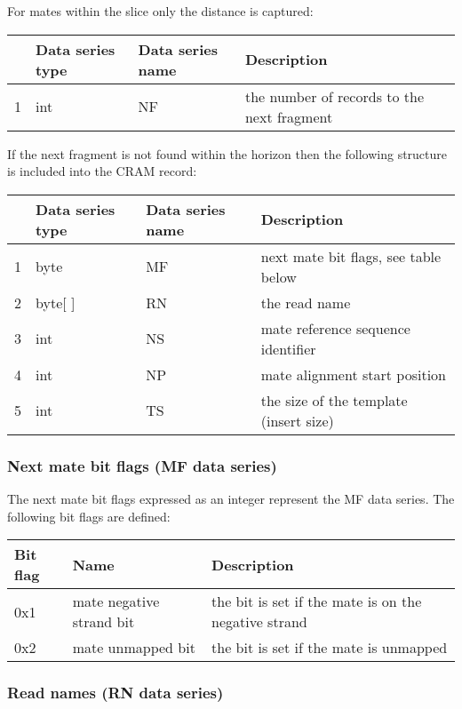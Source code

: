 \documentclass[a4paper]{article}
\begin{document}
For mates within the slice only the distance is captured:

\begin{tabular}{|>{\raggedright}p{7pt}|>{\raggedright}p{68pt}|>{\raggedright}p{115pt}|>{\raggedright}p{228pt}|}
\hline
 & \textbf{Data series type} & \textbf{Data series name} & \textbf{Description}\tabularnewline
\hline
1 & int & NF & the number of records to the next fragment\tabularnewline
\hline
\end{tabular}

If the next fragment is not found within the horizon then the following structure 
is included into the CRAM record:

\begin{tabular}{|>{\raggedright}p{6pt}|>{\raggedright}p{66pt}|>{\raggedright}p{117pt}|>{\raggedright}p{228pt}|}
\hline
 & \textbf{Data series type} & \textbf{Data series name} & \textbf{Description}\tabularnewline
\hline
1 & byte & MF & next mate bit flags, see table below\tabularnewline
\hline
2 & byte[ ] & RN & the read name\tabularnewline
\hline
3 & int & NS & mate reference sequence identifier \tabularnewline
\hline
4 & int & NP & mate alignment start position \tabularnewline
\hline
5 & int & TS & the size of the template (insert size)\tabularnewline
\hline
\end{tabular}

\subsubsection*{}

\subsubsection*{Next mate bit flags (MF data series)}

The next mate bit flags expressed as an integer represent the MF data series. The 
following bit flags are defined:

\begin{tabular}{|>{\raggedright}p{47pt}|>{\raggedright}p{134pt}|>{\raggedright}p{250pt}|}
\hline
\textbf{Bit flag} & \textbf{Name} & \textbf{Description}\tabularnewline
\hline
0x1 & mate negative strand bit & the bit is set if the mate is on the negative 
strand\tabularnewline
\hline
0x2 & mate unmapped bit & the bit is set if the mate is unmapped\tabularnewline
\hline
\end{tabular}

\subsubsection*{Read names (RN data series)}
\end{document}
